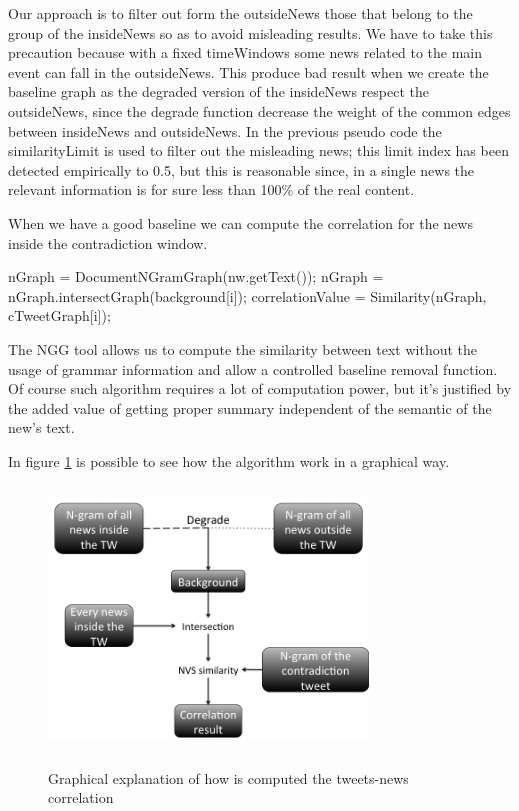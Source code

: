 Our approach is to filter out form the outsideNews those that belong to the group of the insideNews so as to avoid misleading results.
We have to take this precaution because with a fixed timeWindows some news related to the main event can fall in the outsideNews.
This produce bad result when we create the baseline graph as the degraded version of the insideNews respect the outsideNews, since the degrade function decrease the weight of the common edges between insideNews and outsideNews. In the previous pseudo code the similarityLimit is used to filter out the misleading news; this limit index has been detected empirically to 0.5, but this is reasonable since, in a single news the relevant information is for sure less than 100\% of the real content.

When we have a good baseline we can compute the correlation for the news inside the contradiction window.
\begin{algorithmic}
		\STATE nGraph = DocumentNGramGraph(nw.getText());
        \STATE nGraph = nGraph.intersectGraph(background[i]);
        \STATE correlationValue = Similarity(nGraph, cTweetGraph[i]);
	\ENDIF
\ENDFOR        
\end{algorithmic}

The NGG tool allows us to compute the similarity between text without the usage of grammar information and allow a controlled baseline removal function.
Of course such algorithm requires a lot of computation power, but it's justified by the added value of getting proper summary independent of the semantic of the new's text.

In figure \ref{fig:N-gram-expl} is possible to see how the algorithm work in a graphical way.

\begin{figure}[htbp]
	\centering
			{\includegraphics[width=8.5cm,height=7cm]{image/N-gram-expl.png}}	
		\caption[N-gram-expl]{Graphical explanation of how is computed the tweets-news correlation}
	\label{fig:N-gram-expl}
\end{figure} 

